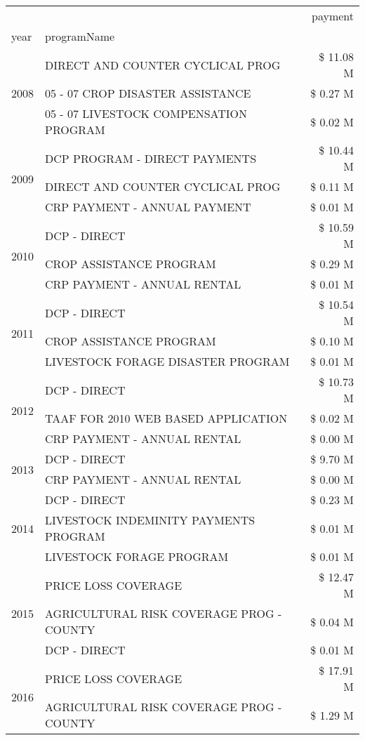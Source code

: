 \begin{tabular}{llr}
\toprule
 &  & payment \\
year & programName &  \\
\midrule
\multirow[t]{3}{*}{2008} & DIRECT AND COUNTER CYCLICAL PROG & \$ 11.08 M \\
 & 05 - 07 CROP DISASTER ASSISTANCE & \$ 0.27 M \\
 & 05 - 07 LIVESTOCK COMPENSATION PROGRAM & \$ 0.02 M \\
\cline{1-3}
\multirow[t]{3}{*}{2009} & DCP PROGRAM - DIRECT PAYMENTS & \$ 10.44 M \\
 & DIRECT AND COUNTER CYCLICAL PROG & \$ 0.11 M \\
 & CRP PAYMENT - ANNUAL PAYMENT & \$ 0.01 M \\
\cline{1-3}
\multirow[t]{3}{*}{2010} & DCP - DIRECT & \$ 10.59 M \\
 & CROP ASSISTANCE PROGRAM & \$ 0.29 M \\
 & CRP PAYMENT - ANNUAL RENTAL & \$ 0.01 M \\
\cline{1-3}
\multirow[t]{3}{*}{2011} & DCP - DIRECT & \$ 10.54 M \\
 & CROP ASSISTANCE PROGRAM & \$ 0.10 M \\
 & LIVESTOCK FORAGE DISASTER PROGRAM & \$ 0.01 M \\
\cline{1-3}
\multirow[t]{3}{*}{2012} & DCP - DIRECT & \$ 10.73 M \\
 & TAAF FOR 2010 WEB BASED APPLICATION & \$ 0.02 M \\
 & CRP PAYMENT - ANNUAL RENTAL & \$ 0.00 M \\
\cline{1-3}
\multirow[t]{2}{*}{2013} & DCP - DIRECT & \$ 9.70 M \\
 & CRP PAYMENT - ANNUAL RENTAL & \$ 0.00 M \\
\cline{1-3}
\multirow[t]{3}{*}{2014} & DCP - DIRECT & \$ 0.23 M \\
 & LIVESTOCK INDEMINITY PAYMENTS PROGRAM & \$ 0.01 M \\
 & LIVESTOCK FORAGE PROGRAM & \$ 0.01 M \\
\cline{1-3}
\multirow[t]{3}{*}{2015} & PRICE LOSS COVERAGE & \$ 12.47 M \\
 & AGRICULTURAL RISK COVERAGE PROG - COUNTY & \$ 0.04 M \\
 & DCP - DIRECT & \$ 0.01 M \\
\cline{1-3}
\multirow[t]{3}{*}{2016} & PRICE LOSS COVERAGE & \$ 17.91 M \\
 & AGRICULTURAL RISK COVERAGE PROG - COUNTY & \$ 1.29 M \\

\end{tabular}
